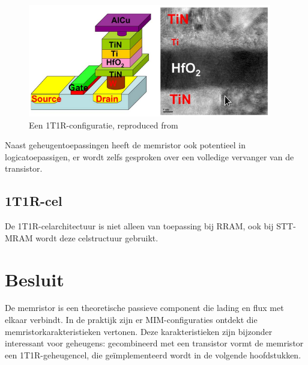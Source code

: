 \begin{figure}
  \centering
  \includegraphics[scale=0.6]{../fig/hfdstk-cel-1T1R.png}
  \caption[Een 1T1R-configuratie]{Een 1T1R-configuratie, reproduced from\cite{Won12}}
  \label{fig:1T1R}
\end{figure}

Naast geheugentoepassingen heeft de memristor ook potentieel in logicatoepassigen, er wordt zelfs gesproken over een volledige vervanger van de transistor\cite{Kue05}.

\subsection{1T1R-cel}
De 1T1R-celarchitectuur is niet alleen van toepassing bij RRAM, ook bij STT-MRAM wordt deze celstructuur gebruikt.

\section{Besluit}
De memristor is een theoretische passieve component die lading en flux met elkaar verbindt. In de praktijk zijn er MIM-configuraties ontdekt die memristorkarakteristieken vertonen. Deze karakteristieken zijn bijzonder interessant voor geheugens: gecombineerd met een transistor vormt de memristor een 1T1R-geheugencel, die geïmplementeerd wordt in de volgende hoofdstukken.
